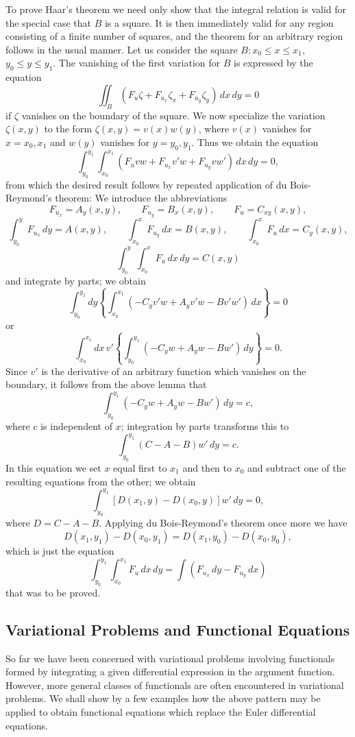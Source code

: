 To prove Haar's theorem we need only show that the integral relation is valid for the special case that $B$ is a square. It is then immediately valid for any region consisting of a finite number of squares, and the theorem for an arbitrary region follows in the usual manner. Let us consider the square $B:x_0\le x\le x_1$, $y_0\le y\le y_1$. The vanishing of the first variation for $B$ is expressed by the equation
\[
\iint_B(F_u\zeta+F_{u_x}\zeta_x+F_{u_y}\zeta_y)\,dx\,dy=0
\]
if $\zeta$ vanishes on the boundary of the square. We now specialize the variation $\zeta(x,y)$ to the form $\zeta(x,y)=v(x)w(y)$, where $v(x)$ vanishes for $x=x_0,x_1$ and $w(y)$ vanishes for $y=y_0,y_1$. Thus we obtain the equation
\[
\int_{y_0}^{y_1}\int_{x_0}^{x_1}
(F_uvw+F_{u_x}v'w+F_{u_y}vw')\,dx\,dy=0,
\]
from which the desired result follows by repeated application of du Bois-Reymond's theorem: We introduce the abbreviations
\[
F_{u_x}=A_y(x,y),\qquad F_{u_y}=B_x(x,y),\qquad F_u=C_{xy}(x,y),
\]
\[
\int_{y_0}^{y}F_{u_x}\,dy=A(x,y),\qquad
\int_{x_0}^{x}F_{u_y}\,dx=B(x,y),\qquad
\int_{x_0}^{x}F_u\,dx=C_y(x,y),
\]
\[
\int_{y_0}^{y}\int_{x_0}^{x}F_u\,dx\,dy=C(x,y)
\]
and integrate by parts; we obtain
\[
\int_{y_0}^{y_1}dy\left\{\int_{x_0}^{x_1}
(-C_yv'w+A_yv'w-Bv'w')\,dx\right\}=0
\]
or
\[
\int_{x_0}^{x_1}dx\,v'\left\{\int_{y_0}^{y_1}
(-C_yw+A_yw-Bw')\,dy\right\}=0.
\]
Since $v'$ is the derivative of an arbitrary function which vanishes on the boundary, it follows from the above lemma that
\[
\int_{y_0}^{y_1}(-C_yw+A_yw-Bw')\,dy=c,
\]
where $c$ is independent of $x$; integration by parts transforms this to
\[
\int_{y_0}^{y_1}(C-A-B)w'\,dy=c.
\]
In this equation we set $x$ equal first to $x_1$ and then to $x_0$ and subtract one of the resulting equations from the other; we obtain
\[
\int_{y_0}^{y_1}[D(x_1,y)-D(x_0,y)]w'\,dy=0,
\]
where $D=C-A-B$. Applying du Bois-Reymond's theorem once more we have
\[
D(x_1,y_1)-D(x_0,y_1)=D(x_1,y_0)-D(x_0,y_0),
\]
which is just the equation
\begin{equation}\tag{35'}
\int_{y_0}^{y_1}\int_{x_0}^{x_1}F_u\,dx\,dy
=\int(F_{u_x}\,dy-F_{u_y}\,dx)
\end{equation}
that was to be proved.

\subsection{Variational Problems and Functional Equations}
So far we have been concerned with variational problems involving functionals formed by integrating a given differential expression in the argument function. However, more general classes of functionals are often encountered in variational problems. We shall show by a few examples how the above pattern may be applied to obtain functional equations which replace the Euler differential equations.

